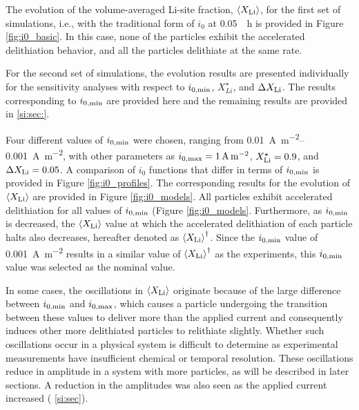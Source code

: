 \documentclass{article}
\begin{document}
The evolution of the volume-averaged Li-site fraction,
$\left<X_{\rm{Li}}\right>$, for the first set of simulations, i.e.,
with the traditional form of $i_0$ at \SI{0.05}{\per\hour} is provided
in Figure \ref{fig:i0_basic}. In this case, none of the particles
exhibit the accelerated delithiation behavior, and all the particles
delithiate at the same rate.

For the second set of simulations, the evolution results are presented
individually for the sensitivity analyses with respect to
$i_{0,\rm{min}}$, $X_{Li}^{\star}$, and $\Delta X_{\rm{Li}}$. The
results corresponding to $i_{0,\rm{min}}$ are provided here and the
remaining results are provided in 
\ref{si:sec:}.

Four different values of $i_{0,\rm{min}}$ were chosen, ranging from
\SIrange{0.01}{0.001}{\ampere\per\meter\squared}, with other
parameters as $i_{0,\rm{max}} = \SI{1}{\ampere\per\meter\squared}$,
$X_{\rm{Li}}^{\star} = 0.9$, and $\Delta X_{\rm{Li}} = 0.05$. A
comparison of $i_0$ functions that differ in terms of $i_{0,\rm{min}}$
is provided in Figure \ref{fig:i0_profiles}. The corresponding results
for the evolution of $\left<X_{\rm{Li}}\right>$ are provided in Figure
\ref{fig:i0_models}. All particles exhibit accelerated delithiation for
all values of $i_{0,\rm{min}}$ (Figure
\ref{fig:i0_models}. Furthermore, as $i_{0,\rm{min}}$ is decreased,
the $\left<X_{\rm{Li}}\right>$ value at which the accelerated
delithiation of each particle halts also decreases, hereafter denoted
as $\left<X_{\rm{Li}}\right>^\dagger$. Since the $i_{0,\rm{min}}$
value of \SI{0.001}{\ampere\per\meter\squared} results in a similar
value of $\left<X_{\rm{Li}}\right>^\dagger$ as the experiments, this
$i_{0,\rm{min}}$ value was selected as the nominal value.

In some cases, the oscillations in $\left<X_{\rm{Li}}\right>$
originate because of the large difference between $i_{0,\rm{min}}$ and
$i_{0,\rm{max}}$, which causes a particle undergoing the transition
between these values to deliver more than the applied current and
consequently induces other more delithiated particles to relithiate
slightly. Whether such oscillations occur in a physical system is
difficult to determine as experimental measurements have insufficient
chemical or temporal resolution. These oscillations reduce in
amplitude in a system with more particles, as will be described in
later sections. A reduction in the amplitudes was also seen as the
applied current increased (
\ref{si:sec}).
\end{document}
